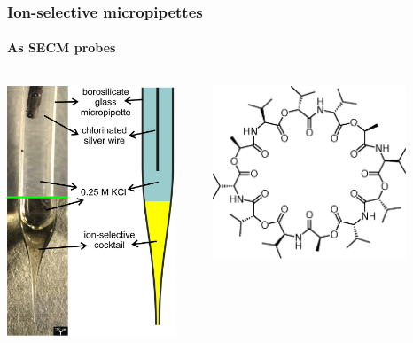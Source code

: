 \documentclass{beamer}
\begin{document}
\begin{frame}
\frametitle{Ion-selective micropipettes}
\framesubtitle{As SECM probes}
\begin{columns}[T] %
\begin{column}{.48\textwidth}

\centering
\includegraphics[width=0.9\textwidth]{liquid.jpg}
\end{column}%
\hfill%
\begin{column}{.48\textwidth}
\centering

\includegraphics[width=0.8\textwidth]{Valinomycin.eps}


\end{column}
\end{columns}
\end{frame}
\end{document}
